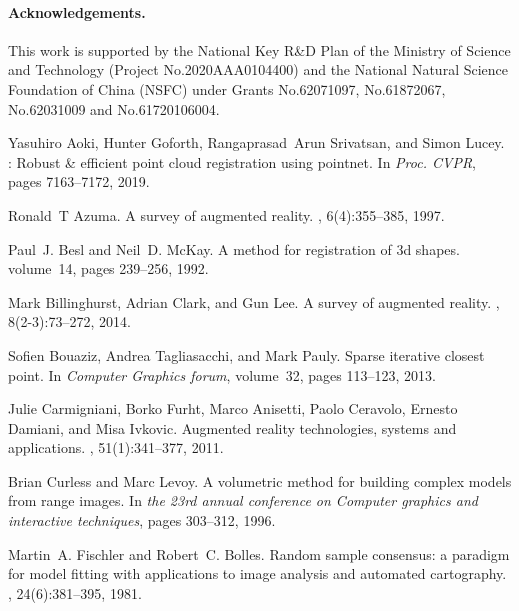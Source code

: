 \documentclass[10pt,twocolumn,letterpaper]{article}
\begin{document}
\paragraph{Acknowledgements.} 
This work is supported by the National Key R\&D Plan of the Ministry of Science and Technology (Project No.2020AAA0104400) and the National Natural Science Foundation of China (NSFC) under Grants No.62071097, No.61872067, No.62031009 and No.61720106004. 
\begin{thebibliography}{10}\itemsep=-1pt

Yasuhiro Aoki, Hunter Goforth, Rangaprasad~Arun Srivatsan, and Simon Lucey.
: Robust \& efficient point cloud registration using
  pointnet.
\newblock In {\em {Proc. CVPR}}, pages 7163--7172, 2019.

Ronald~T Azuma.
\newblock A survey of augmented reality.
, 6(4):355--385,
  1997.

Paul~J. Besl and Neil~D. McKay.
\newblock A method for registration of 3d shapes.
\newblock volume~14, pages 239--256, 1992.

Mark Billinghurst, Adrian Clark, and Gun Lee.
\newblock A survey of augmented reality.
, 8(2-3):73--272, 2014.

Sofien Bouaziz, Andrea Tagliasacchi, and Mark Pauly.
\newblock Sparse iterative closest point.
\newblock In {\em Computer Graphics forum}, volume~32, pages 113--123, 2013.

Julie Carmigniani, Borko Furht, Marco Anisetti, Paolo Ceravolo, Ernesto
  Damiani, and Misa Ivkovic.
\newblock Augmented reality technologies, systems and applications.
, 51(1):341--377, 2011.

Brian Curless and Marc Levoy.
\newblock A volumetric method for building complex models from range images.
\newblock In {\em the 23rd annual conference on Computer graphics and
  interactive techniques}, pages 303--312, 1996.

Martin~A. Fischler and Robert~C. Bolles.
\newblock Random sample consensus: a paradigm for model fitting with
  applications to image analysis and automated cartography.
, 24(6):381--395, 1981.


\end{thebibliography}
\end{document}
